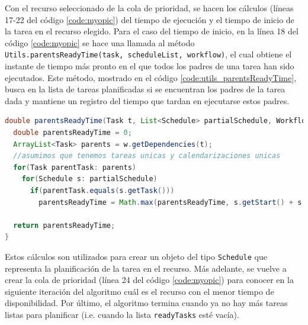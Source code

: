 Con el recurso seleccionado de la cola de prioridad, se hacen los cálculos (líneas 17-22 del código \ref{code:myopic}) del tiempo de ejecución y el tiempo de inicio de la tarea en el recurso elegido. Para el caso del tiempo de inicio, en la línea 18 del código \ref{code:myopic} se hace una llamada al método \texttt{Utils.parentsReadyTime(task, scheduleList, workflow)}, el cual obtiene el instante de tiempo más pronto en el que todos los padres de una tarea han sido ejecutados. Este método, mostrado en el código \ref{code:utils_parentsReadyTime}, busca en la lista de tareas planificadas si se encuentran los padres de la tarea dada y mantiene un registro del tiempo que tardan en ejecutarse estos padres.

\begin{lstlisting}[language=java,label={code:utils_parentsReadyTime},caption={Método que calcula el tiempo mínimo en el que los padres de una tarea dada han sido ejecutados.},float]
double parentsReadyTime(Task t, List<Schedule> partialSchedule, Workflow w) {
  double parentsReadyTime = 0;
  ArrayList<Task> parents = w.getDependencies(t);
  //asumimos que tenemos tareas unicas y calendarizaciones unicas
  for(Task parentTask: parents)
    for(Schedule s: partialSchedule)
      if(parentTask.equals(s.getTask()))
        parentsReadyTime = Math.max(parentsReadyTime, s.getStart() + s.getDuration());

  return parentsReadyTime;
}
\end{lstlisting}

Estos cálculos son utilizados para crear un objeto del tipo \texttt{Schedule} que representa la planificación de la tarea en el recurso. Más adelante, se vuelve a crear la cola de prioridad (línea 24 del código \ref{code:myopic}) para conocer en la siguiente iteración del algoritmo cuál es el recurso con el menor tiempo de disponibilidad. Por último, el algoritmo termina cuando ya no hay más tareas listas para planificar (i.e. cuando la lista \texttt{readyTasks} esté vacía).


